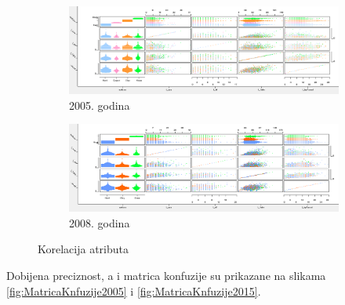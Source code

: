 \documentclass[a4paper]{article}
\begin{document}
\begin{figure}[H]
	\begin{subfigure}[h]{\textwidth}
		\begin{center}
			\includegraphics[scale=0.45]{Klasifikacija/DrvoOdlucivanja/2005/Korelacija.png}
		\end{center}
		\caption{2005. godina}
		\label{fig:KlasifikacijaScatterMatrix2005}
	\end{subfigure}
	
	\vspace{0.5cm}
	\begin{subfigure}[h]{\textwidth}
		\begin{center}
			\includegraphics[scale=0.45]{Klasifikacija/DrvoOdlucivanja/2015/Korelacija.png}
		\end{center}
		\caption{2008. godina}
		\label{fig:KlasifikacijaScatterMatrix2015}
	\end{subfigure}
	
	\caption{Korelacija atributa}
	\label{fig:KlasifikacijaScatterMatrix}
\end{figure}

Dobijena preciznost, a i matrica konfuzije su prikazane na slikama \ref{fig:MatricaKnfuzije2005} i \ref{fig:MatricaKnfuzije2015}.
\end{document}

